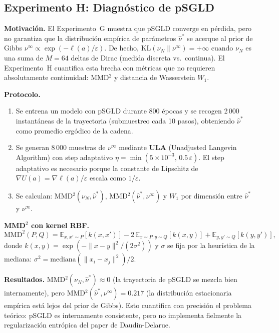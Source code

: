 \documentclass[11pt, a4paper]{article}
\theoremstyle{definition}
\newcommand{\E}{\mathbb{E}}
\begin{document}
\subsection{Experimento H: Diagnóstico de pSGLD}
\label{sec:exp_h}

\textbf{Motivación.} El Experimento~G muestra que pSGLD converge en pérdida,
pero no garantiza que la distribución empírica de parámetros $\hat{\nu}^*$
se acerque al prior de Gibbs $\nu^\infty \propto \exp(-\ell(a)/\varepsilon)$.
De hecho, $\mathrm{KL}(\nu_N \| \nu^\infty) = +\infty$ cuando $\nu_N$ es
una suma de $M=64$ deltas de Dirac (medida discreta vs.\ continua).
El Experimento~H cuantifica esta brecha con métricas que no requieren
absolutamente continuidad: MMD$^2$ y distancia de Wasserstein $W_1$.

\textbf{Protocolo.}
\begin{enumerate}
  \item Se entrena un modelo con pSGLD durante 800 épocas y se recogen
        2\,000 instantáneas de la trayectoria (submuestreo cada 10 pasos),
        obteniendo $\hat{\nu}^*$ como promedio ergódico de la cadena.
  \item Se generan 8\,000 muestras de $\nu^\infty$ mediante
        \textbf{ULA} (Unadjusted Langevin Algorithm) con step adaptativo
        $\eta = \min(5\times10^{-3},\, 0.5\,\varepsilon)$.
        El step adaptativo es necesario porque la constante de Lipschitz
        de $\nabla U(a) = \nabla\ell(a)/\varepsilon$ escala como $1/\varepsilon$.
  \item Se calculan: MMD$^2(\nu_N, \hat{\nu}^*)$,
        MMD$^2(\hat{\nu}^*, \nu^\infty)$ y $W_1$ por dimensión entre
        $\hat{\nu}^*$ y $\nu^\infty$.
\end{enumerate}

\textbf{MMD$^2$ con kernel RBF.}
\[
  \mathrm{MMD}^2(P, Q) = \E_{x,x'\sim P}[k(x,x')]
  - 2\,\E_{x\sim P,y\sim Q}[k(x,y)]
  + \E_{y,y'\sim Q}[k(y,y')],
\]
donde $k(x,y) = \exp(-\|x-y\|^2 / (2\sigma^2))$ y $\sigma$ se fija
por la heurística de la mediana: $\sigma^2 = \mathrm{mediana}(\|x_i - x_j\|^2)/2$.

\textbf{Resultados.} MMD$^2(\nu_N, \hat{\nu}^*) \approx 0$
(la trayectoria de pSGLD se mezcla bien internamente), pero
MMD$^2(\hat{\nu}^*, \nu^\infty) = 0.217$
(la distribución estacionaria empírica está lejos del prior de Gibbs).
Esto cuantifica con precisión el problema teórico: pSGLD es internamente
consistente, pero no implementa fielmente la regularización entrópica
del paper de Daudin-Delarue.
\end{document}
